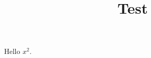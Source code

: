 \documentclass[conference]{IEEEtran}
\begin{document}
\title{Test}
\author{}
\maketitle
Hello $x^2$.
\end{document}
